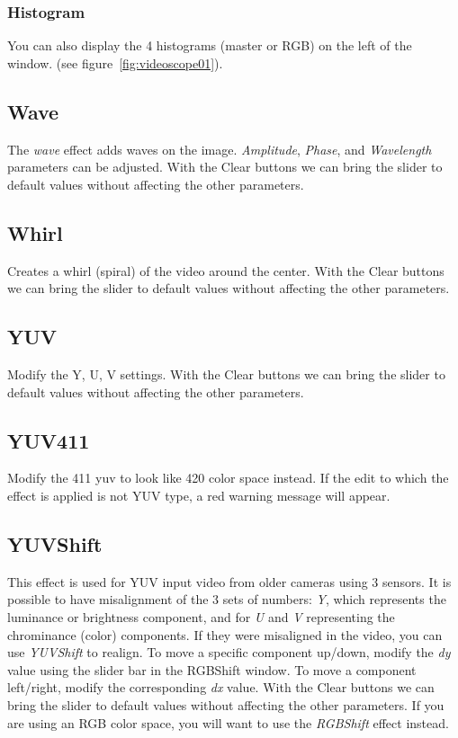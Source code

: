 {\subsubsection*{Histogram}%
\label{ssub:histogram}

You can also display the 4 histograms (master or RGB) on the left of the window. (see figure~\ref{fig:videoscope01}).

\subsection{Wave}%
\label{sub:wave}

The \textit{wave} effect adds waves on the image. \textit{Amplitude}, \textit{Phase}, and \textit{Wavelength} parameters can be adjusted. With the Clear buttons we can bring the slider to default values without affecting the other parameters.

\subsection{Whirl}%
\label{sub:whirl}

Creates a whirl (spiral) of the video around the center. With the Clear buttons we can bring the slider to default values without affecting the other parameters.

\subsection{YUV}%
\label{sub:yuv}

Modify the Y, U, V settings. With the Clear buttons we can bring the slider to default values without affecting the other parameters.

\subsection{YUV411}%
\label{sub:yuv411}

Modify the 411 yuv to look like 420 color space instead. If the edit to which the effect is applied is not YUV type, a red warning message will appear.

\subsection{YUVShift}%
\label{sub:yuvshift}

This effect is used for YUV input video from older cameras using $3$ sensors. It is possible to have misalignment of the $3$ sets of numbers: \textit{Y}, which represents the luminance or brightness component, and for \textit{U} and \textit{V} representing the chrominance (color) components. If they were misaligned in the video, you can use \textit{YUVShift} to realign. To move a specific component up/down, modify the \textit{dy} value using the slider bar in the RGBShift window. To move a component left/right, modify the corresponding \textit{dx} value. With the Clear buttons we can bring the slider to default values without affecting the other parameters. If you are using an RGB color space, you will want to use the \textit{RGBShift} effect instead.

}
